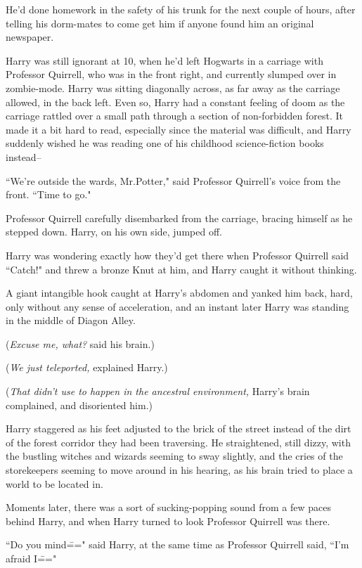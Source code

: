 He'd done homework in the safety of his trunk for the next couple of hours, after telling his dorm-mates to come get him if anyone found him an original newspaper.

Harry was still ignorant at 10\am, when he'd left Hogwarts in a carriage with Professor Quirrell, who was in the front right, and currently slumped over in zombie-mode. Harry was sitting diagonally across, as far away as the carriage allowed, in the back left. Even so, Harry had a constant feeling of doom as the carriage rattled over a small path through a section of non-forbidden forest. It made it a bit hard to read, especially since the material was difficult, and Harry suddenly wished he was reading one of his childhood science-fiction books instead\---

``We're outside the wards, Mr.\?Potter," said Professor Quirrell's voice from the front. ``Time to go."

Professor Quirrell carefully disembarked from the carriage, bracing himself as he stepped down. Harry, on his own side, jumped off.

Harry was wondering exactly how they'd get there when Professor Quirrell said ``Catch!" and threw a bronze Knut at him, and Harry caught it without thinking.

A giant intangible hook caught at Harry's abdomen and yanked him back, hard, only without any sense of acceleration, and an instant later Harry was standing in the middle of Diagon Alley.

(\emph{Excuse me, what?} said his brain.)

(\emph{We just teleported,} explained Harry.)

(\emph{That didn't use to happen in the ancestral environment,} Harry's brain complained, and disoriented him.)

Harry staggered as his feet adjusted to the brick of the street instead of the dirt of the forest corridor they had been traversing. He straightened, still dizzy, with the bustling witches and wizards seeming to sway slightly, and the cries of the storekeepers seeming to move around in his hearing, as his brain tried to place a world to be located in.

Moments later, there was a sort of sucking-popping sound from a few paces behind Harry, and when Harry turned to look Professor Quirrell was there.

``Do you mind\===" said Harry, at the same time as Professor Quirrell said, ``I'm afraid I\==="

